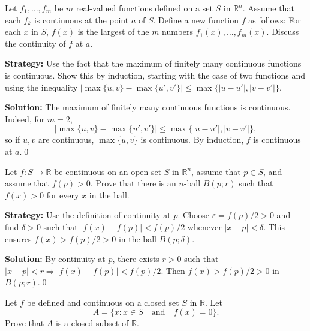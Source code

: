 \begin{problembox}
\begin{problemstatement}
Let \( f_1, \ldots, f_m \) be \( m \) real-valued functions defined on a set \( S \) in \( \mathbb{R}^n \). Assume that each \( f_k \) is continuous at the point \( a \) of \( S \). Define a new function \( f \) as follows: For each \( x \) in \( S \), \( f(x) \) is the largest of the \( m \) numbers \( f_1(x), \ldots, f_m(x) \). Discuss the continuity of \( f \) at \( a \).
\end{problemstatement}
\end{problembox}

\noindent\textbf{Strategy:} Use the fact that the maximum of finitely many continuous functions is continuous. Show this by induction, starting with the case of two functions and using the inequality $|\max\{u,v\} - \max\{u',v'\}| \leq \max\{|u-u'|, |v-v'|\}$.

\bigskip\noindent\textbf{Solution:}
The maximum of finitely many continuous functions is continuous. Indeed, for $m=2$,
\[
|\max\{u,v\}-\max\{u',v'\}|\le \max\{|u-u'|,|v-v'|\},
\]
so if $u,v$ are continuous, $\max\{u,v\}$ is continuous. By induction, $f$ is continuous at $a$.\qed



\begin{problembox}
\begin{problemstatement}
Let \( f: S \to \mathbb{R} \) be continuous on an open set \( S \) in \( \mathbb{R}^n \), assume that \( p \in S \), and assume that \( f(p) > 0 \). Prove that there is an \( n \)-ball \( B(p; r) \) such that \( f(x) > 0 \) for every \( x \) in the ball.
\end{problemstatement}
\end{problembox}

\noindent\textbf{Strategy:} Use the definition of continuity at $p$. Choose $\varepsilon = f(p)/2 > 0$ and find $\delta > 0$ such that $|f(x) - f(p)| < f(p)/2$ whenever $|x-p| < \delta$. This ensures $f(x) > f(p)/2 > 0$ in the ball $B(p;\delta)$.

\bigskip\noindent\textbf{Solution:}
By continuity at $p$, there exists $r>0$ such that $|x-p|<r\Rightarrow |f(x)-f(p)|<f(p)/2$. Then $f(x)>f(p)/2>0$ in $B(p;r)$.\qed



\begin{problembox}
\begin{problemstatement}
Let \( f \) be defined and continuous on a closed set \( S \) in \( \mathbb{R} \). Let
\[A = \{x : x \in S \quad \text{and} \quad f(x) = 0\}.\]
Prove that \( A \) is a closed subset of \( \mathbb{R} \).
\end{problemstatement}
\end{problembox}

